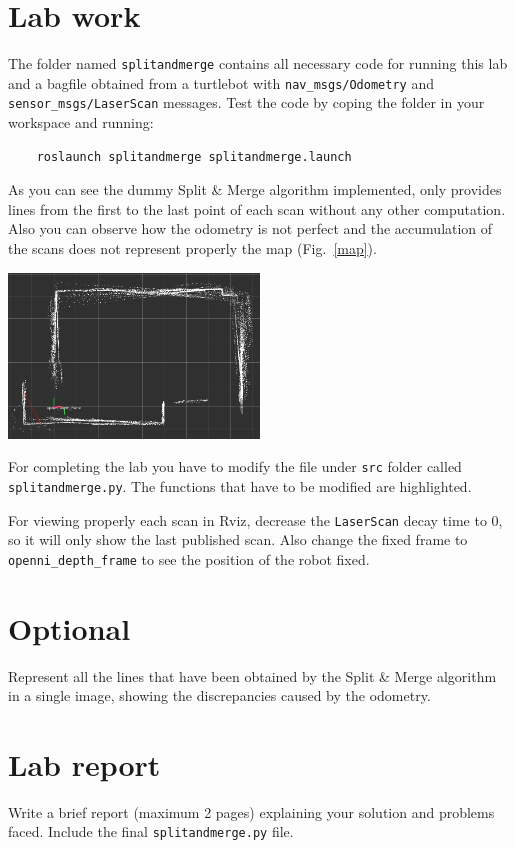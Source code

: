 \documentclass[a4paper,10pt]{article}
\begin{document}
\section{Lab work}

The folder named \texttt{splitandmerge} contains all necessary code for running this lab and a bagfile obtained from a turtlebot with \texttt{nav\_msgs/Odometry} and \texttt{sensor\_msgs/LaserScan} messages. Test the code by coping the folder in your workspace and running:

\begin{verbatim}
    roslaunch splitandmerge splitandmerge.launch
\end{verbatim}

As you can see the dummy Split \& Merge algorithm implemented, only provides lines from the first to the last point of each scan without any other computation. Also you can observe how
the odometry is not perfect and the accumulation of the scans does not represent properly the map (Fig.~\ref{map}).

\begin{center}
	\includegraphics[width=0.50\textwidth]{lab2-scans}
	\label{map}
\end{center}

For completing the lab you have to modify the file under \texttt{src} folder called \texttt{splitandmerge.py}. The functions that have to be modified are highlighted.

For viewing properly each scan in Rviz, decrease the \texttt{LaserScan} decay time to 0, so it will only show the last published scan. Also change the fixed frame to \texttt{openni\_depth\_frame} to see the position of the robot fixed.

\section{Optional}

Represent all the lines that have been obtained by the Split \& Merge algorithm in a single image, showing the discrepancies caused by the odometry.

\section{Lab report}

Write a brief report (maximum 2 pages) explaining your solution and problems faced. Include the final \texttt{splitandmerge.py} file.
\end{document}
